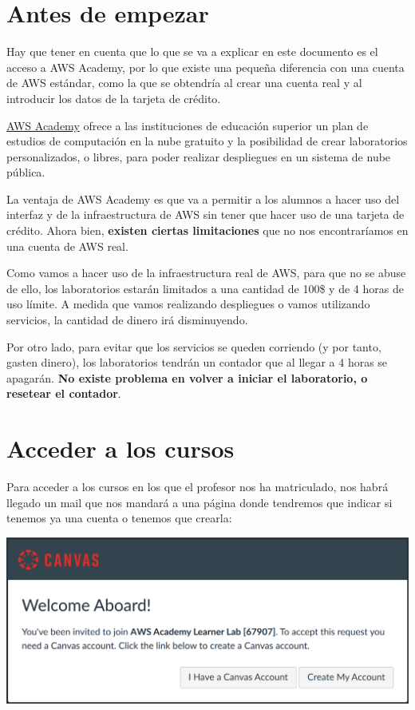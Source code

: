\chapter{Antes de empezar}

Hay que tener en cuenta que lo que se va a explicar en este documento es el acceso a AWS Academy, por lo que existe una pequeña diferencia con una cuenta de AWS estándar, como la que se obtendría al crear una cuenta real y al introducir los datos de la tarjeta de crédito.

\href{https://aws.amazon.com/es/training/awsacademy/}{AWS Academy} ofrece a las instituciones de educación superior un plan de estudios de computación en la nube gratuito y la posibilidad de crear laboratorios personalizados, o libres, para poder realizar despliegues en un sistema de nube pública.

La ventaja de AWS Academy es que va a permitir a los alumnos a hacer uso del interfaz y de la infraestructura de AWS sin tener que hacer uso de una tarjeta de crédito. Ahora bien, \textbf{existen ciertas limitaciones} que no nos encontraríamos en una cuenta de AWS real.

Como vamos a hacer uso de la infraestructura real de AWS, para que no se abuse de ello, los laboratorios estarán limitados a una cantidad de 100\$ y de 4 horas de uso límite. A medida que vamos realizando despliegues o vamos utilizando servicios, la cantidad de dinero irá disminuyendo.

Por otro lado, para evitar que los servicios se queden corriendo (y por tanto, gasten dinero), los laboratorios tendrán un contador que al llegar a 4 horas se apagarán. \textbf{No existe problema en volver a iniciar el laboratorio, o resetear el contador}.


\chapter{Acceder a los cursos}

Para acceder a los cursos en los que el profesor nos ha matriculado, nos habrá llegado un mail que nos mandará a una página donde tendremos que indicar si tenemos ya una cuenta o tenemos que crearla:

\begin{center}
	\includegraphics[width=0.7\linewidth]{img/aws/create_account.png}
\end{center}

